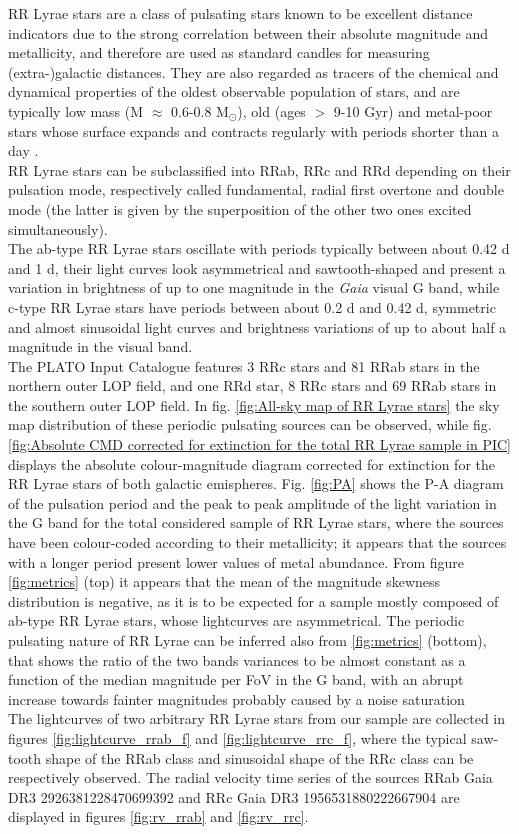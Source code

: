 RR Lyrae stars are a class of pulsating stars known to be excellent distance indicators due to the strong correlation between their absolute magnitude and metallicity, and therefore are used as standard candles for measuring (extra-)galactic distances.
They are also regarded as tracers of the chemical and dynamical properties of the oldest observable population of stars, and are typically low mass (M $ \approx$ 0.6-0.8 $\mathrm{M_{\odot}}$), old (ages $>$ 9-10 Gyr) and metal-poor stars whose surface expands
and contracts regularly with periods shorter than a day \parencite{refId4}.\\
RR Lyrae stars can be subclassified into RRab, RRc and RRd depending on their pulsation mode, respectively called fundamental, radial first overtone and double mode (the latter is given by the superposition of the other two ones excited simultaneously).\\
The ab-type RR Lyrae stars oscillate with periods typically between about 0.42 d and 1 d, their light curves look asymmetrical and sawtooth-shaped and present a variation in brightness of up to one magnitude in the \textit{Gaia} visual G band, while c-type RR Lyrae stars have periods between about 0.2 d and 0.42 d, symmetric and almost sinusoidal light curves and brightness variations of up to about half a magnitude in the visual band.\\
The PLATO Input Catalogue features 3 RRc stars and 81 RRab stars in the northern outer LOP field, and one RRd star, 8 RRc stars and 69 RRab stars in the southern outer LOP field. 
In fig. \ref{fig:All-sky map of RR Lyrae stars} the sky map distribution of these periodic pulsating sources can be observed, while fig. \ref{fig:Absolute CMD corrected for extinction for the total RR Lyrae sample in PIC} displays the absolute colour-magnitude diagram corrected for extinction for the RR Lyrae stars of both galactic emispheres.
Fig. \ref{fig:PA} shows the P-A diagram of the pulsation period and the peak to peak amplitude of the light variation in the G band for the total considered sample of RR Lyrae stars, where the sources have been colour-coded according to their metallicity; it appears that the sources with a longer period present lower values of metal abundance.
From figure \ref{fig:metrics} (top) it appears that the mean of the magnitude skewness distribution is negative, as it is to be expected for a sample mostly composed of ab-type RR Lyrae stars, whose lightcurves are asymmetrical.
The periodic pulsating nature of RR Lyrae can be inferred also from \ref{fig:metrics} (bottom), that shows the ratio of the two bands variances to be almost constant as a function of the median magnitude per FoV in the G band, with an abrupt increase towards fainter magnitudes probably caused by a noise saturation\\
The lightcurves of two arbitrary RR Lyrae stars from our sample are collected in figures \ref{fig:lightcurve_rrab_f} and \ref{fig:lightcurve_rrc_f}, where the typical saw-tooth shape of the RRab class and sinusoidal shape of the RRc class can be respectively observed.
The radial velocity time series of the sources RRab Gaia DR3 2926381228470699392 and RRc Gaia DR3 1956531880222667904 are displayed in figures \ref{fig:rv_rrab} and \ref{fig:rv_rrc}.



